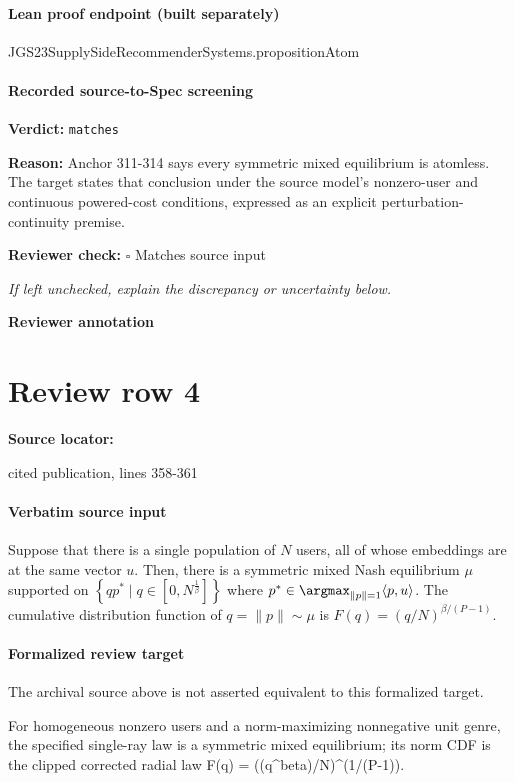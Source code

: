 \documentclass[10pt]{article}
\newcommand{\reviewerbox}{%
  \par\noindent\fbox{\parbox{0.96\linewidth}{\rule{0pt}{0.38in}}}\par
}
\newcommand{\reviewmatch}[1]{%
  \par\noindent\textbf{Reviewer check:} $\square$\; #1\par
  \noindent\emph{If left unchecked, explain the discrepancy or uncertainty below.}\par
}
\begin{document}
\paragraph{Lean proof endpoint (built separately)}\begin{ReviewVerbatim}
JGS23SupplySideRecommenderSystems.propositionAtom
\end{ReviewVerbatim}

\paragraph{Recorded source-to-Spec screening}
\textbf{Verdict:} \texttt{matches}
\\
{\raggedright
\textbf{Reason:} Anchor 311-\allowbreak{}314 says every symmetric mixed equilibrium is atomless.\allowbreak{}  The target states that conclusion under the source model's nonzero-\allowbreak{}user and continuous powered-\allowbreak{}cost conditions, expressed as an explicit perturbation-\allowbreak{}continuity premise.\allowbreak{}
\par}
\reviewmatch{Matches source input}
\noindent\textbf{Reviewer annotation}\par
\reviewerbox
\clearpage
\hypertarget{source-claim-f806add30f2f91cd}{}
\section*{Review row 4}
\textbf{Source locator:} {\footnotesize\raggedright cited publication, lines 358-\allowbreak{}361\par}
\paragraph{Verbatim source input}
\begin{ReviewVerbatim}
\begin{corollary}
\label{cor:onepopulation}
Suppose that there is a single population of $N$ users, all of whose embeddings are at the same vector $u$. Then, there is a symmetric mixed Nash equilibrium $\mu$ supported on $\left\{ q p^* \mid q \in [0, N^{\frac{1}{\beta}}] \right\}$ where $p^* \in \argmax_{\|p \| = 1 } \langle p, u \rangle$. The cumulative distribution function of $q = \|p\| \sim \mu$ is $F(q) = \left(q/N\right)^{\beta / (P-1)}$.
\end{corollary}
\end{ReviewVerbatim}


\paragraph{Formalized review target}
The archival source above is not asserted equivalent to this formalized target.
\begin{ReviewVerbatim}
For homogeneous nonzero users and a norm-maximizing nonnegative unit genre, the specified single-ray law is a symmetric mixed equilibrium; its norm CDF is the clipped corrected radial law F(q) = ((q^beta)/N)^(1/(P-1)).
\end{ReviewVerbatim}
\end{document}
